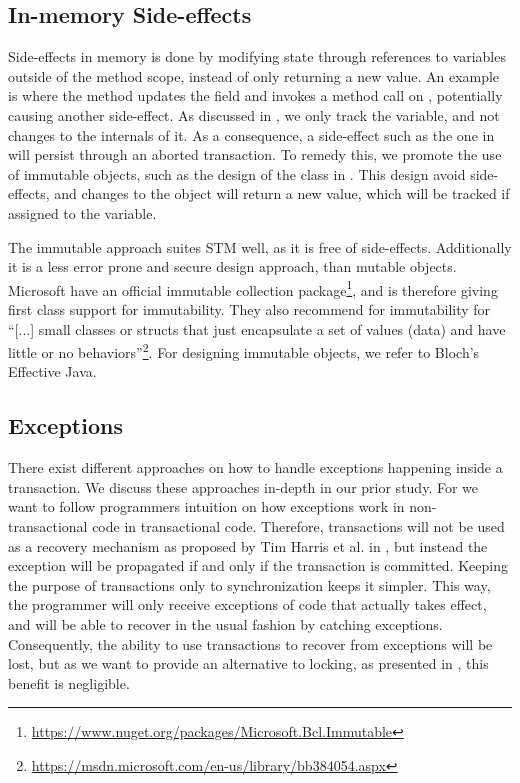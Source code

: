 \subsection{In-memory Side-effects}
Side-effects in memory is done by modifying state through references to variables outside of the method scope, instead of only returning a new value. An example is  where the  method updates the field  and invokes a method call on , potentially causing another side-effect. As discussed in , we only track the variable, and not changes to the internals of it. As a consequence, a side-effect such as the one in  will persist through an aborted transaction. To remedy this, we promote the use of immutable objects, such as the design of the  class in . This design avoid side-effects, and changes to the object will return a new value, which will be tracked if assigned to the variable.

The immutable approach suites \ac{STM} well, as it is free of side-effects. Additionally it is a less error prone and secure design approach, than mutable objects\cite[p. 73]{bloch2008effective}. Microsoft have an official immutable collection package\footnote{\url{https://www.nuget.org/packages/Microsoft.Bcl.Immutable}}, and is therefore giving first class support for immutability. They also recommend for immutability for ``[...] small classes or structs that just encapsulate a set of values (data) and have little or no behaviors''\footnote{\url{https://msdn.microsoft.com/en-us/library/bb384054.aspx}}. For designing immutable objects, we refer to Bloch's Effective Java\cite[p. 73-80]{bloch2008effective}.

\subsection{Exceptions}
There exist different approaches on how to handle exceptions happening inside a transaction. We discuss these approaches in-depth in our prior study\cite[p. 50-51]{dpt907e14trending}. For \stmnamesp we want to follow programmers intuition on how exceptions work in non-transactional code in transactional code. Therefore, transactions will not be used as a recovery mechanism as proposed by Tim Harris et al. in \cite{harris2005exceptions}, but instead the exception will be propagated if and only if the transaction is committed. Keeping the purpose of transactions only to synchronization keeps it simpler. This way, the programmer will only receive exceptions of code that actually takes effect, and will be able to recover in the usual fashion by catching exceptions. Consequently, the ability to use transactions to recover from exceptions will be lost, but as we want to provide an alternative to locking, as presented in , this benefit is negligible.

